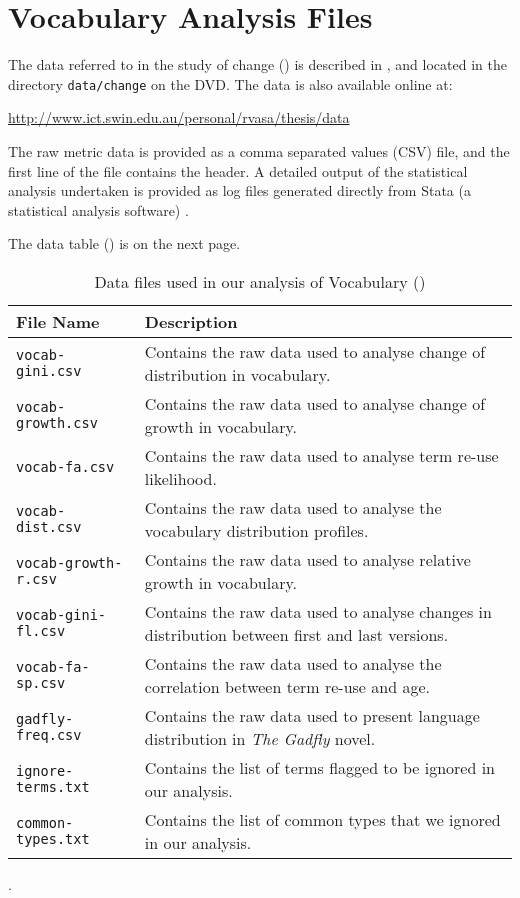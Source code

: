 \appendix

\chapter{Vocabulary Analysis Files} %
\label{cha:vocabulary_analysis_files}

The data referred to in the study of change () is  described in , and located in the directory \texttt{data/change} on the DVD. The data is also available online at: 
\vspace{-0.5cm}

\url{http://www.ict.swin.edu.au/personal/rvasa/thesis/data}

The raw metric data is provided as a comma separated values (CSV) file, and the first line of the file contains the header. A detailed output of the statistical analysis undertaken is provided as log files generated directly from Stata (a statistical analysis software) \cite{Stata09a}.

The data table () is on the next page.

\begin{table}[t]
\vspace{-3.0cm}
\centering
\begin{tabular}{|l|p{}|}
\hline
{\bf File Name}  & {\bf Description} \\
\hline \hline 
\texttt{vocab-gini.csv} & Contains the raw data used to analyse change of distribution in vocabulary. \\
\hline
\texttt{vocab-growth.csv} & Contains the raw data used to analyse change of growth in vocabulary. \\
\hline
\texttt{vocab-fa.csv} & Contains the raw data used to analyse term re-use likelihood. \\
\hline
\texttt{vocab-dist.csv} & Contains the raw data used to analyse the vocabulary distribution profiles. \\
\hline
\texttt{vocab-growth-r.csv} & Contains the raw data used to analyse relative growth in vocabulary. \\
\hline
\texttt{vocab-gini-fl.csv} & Contains the raw data used to analyse changes in distribution between first and last versions. \\
\hline
\texttt{vocab-fa-sp.csv} & Contains the raw data used to analyse the correlation between term re-use and age. \\
\hline
\texttt{gadfly-freq.csv} & Contains the raw data used to present language distribution in \emph{The Gadfly} novel. \\
\hline
\texttt{ignore-terms.txt} & Contains the list of terms flagged to be ignored in our analysis. \\
\hline
\texttt{common-types.txt} & Contains the list of common types that we ignored in our analysis. \\
\hline

\end{tabular}
\caption{Data files used in our analysis of Vocabulary ()}.
\label{tab:change_files}
\end{table}

